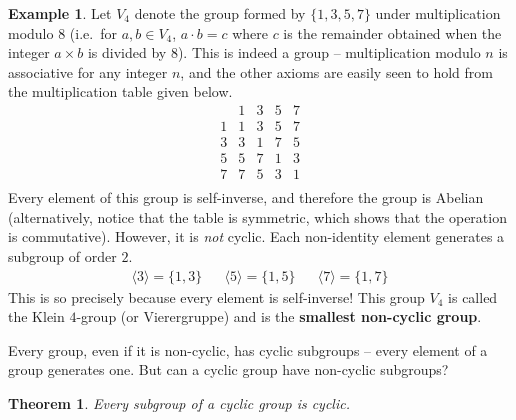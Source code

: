 \documentclass[svgnames]{article}
\newtheorem{Theorem}{Theorem}[section]
\theoremstyle{definition}
\newtheorem{Example}[Example]{Example}
\theoremstyle{remark}
\newcommand{\newterm}[1]{{\color{alertcolor} #1}}
\begin{document}
\begin{Example}\label{ex:V4}
Let $V_4$ denote the group formed by $\{1, 3, 5, 7\}$ under multiplication modulo $8$ (i.e.\ for $a, b \in V_4$, $a \cdot b = c$ where $c$ is the remainder obtained when the integer $a \times b$ is divided by $8$). This is indeed a group -- multiplication modulo $n$ is associative for any integer $n$, and the other axioms are easily seen to hold from the multiplication table given below.
\begin{equation*}
\begin{array}{c|cccc}
	&	1	&	3	&	5	&	7\\
\hline
1	&	1	&	3	&	5	&	7\\
3	&	3	&	1	&	7	&	5\\
5	&	5	&	7	&	1	&	3\\
7	&	7	&	5	&	3	&	1\\
\end{array}
\end{equation*}
Every element of this group is self-inverse, and therefore the group is Abelian (alternatively, notice that the table is symmetric, which shows that the operation is commutative). However, it is \emph{not} cyclic. Each non-identity element generates a subgroup of order $2$.
\begin{align*}
\langle 3 \rangle = \{1, 3\} && \langle 5 \rangle = \{1, 5\} && \langle 7 \rangle = \{1, 7\}
\end{align*}
This is so precisely because every element is self-inverse! This group $V_4$ is called the \newterm{Klein $4$-group} (or \newterm{Vierergruppe}) and is the \textbf{smallest non-cyclic group}.
\end{Example}

Every group, even if it is non-cyclic, has cyclic subgroups -- every element of a group generates one. But can a cyclic group have non-cyclic subgroups?

\begin{Theorem}
Every subgroup of a cyclic group is cyclic.
\end{Theorem}
\end{document}

